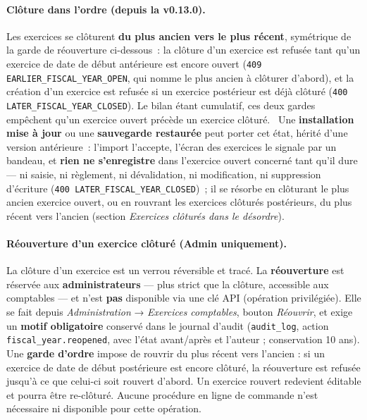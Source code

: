 \documentclass[a4paper,11pt,oneside]{article}
\begin{document}
\paragraph{Clôture dans l'ordre (depuis la v0.13.0).}
Les exercices se clôturent \textbf{du plus ancien vers le plus récent}, symétrique de la garde de réouverture ci-dessous~: la clôture d'un exercice est refusée tant qu'un exercice de date de début antérieure est encore ouvert (\texttt{409 EARLIER\_\allowbreak FISCAL\_\allowbreak YEAR\_\allowbreak OPEN}, qui nomme le plus ancien à clôturer d'abord), et la création d'un exercice est refusée si un exercice postérieur est déjà clôturé (\texttt{400 LATER\_\allowbreak FISCAL\_\allowbreak YEAR\_\allowbreak CLOSED}). Le bilan étant cumulatif, ces deux gardes empêchent qu'un exercice ouvert précède un exercice clôturé. \keshAttention\ Une \textbf{installation mise à jour} ou une \textbf{sauvegarde restaurée} peut porter cet état, hérité d'une version antérieure~: l'import l'accepte, l'écran des exercices le signale par un bandeau, et \textbf{rien ne s'enregistre} dans l'exercice ouvert concerné tant qu'il dure --- ni saisie, ni règlement, ni dévalidation, ni modification, ni suppression d'écriture (\texttt{400 LATER\_\allowbreak FISCAL\_\allowbreak YEAR\_\allowbreak CLOSED})~; il se résorbe en clôturant le plus ancien exercice ouvert, ou en rouvrant les exercices clôturés postérieurs, du plus récent vers l'ancien (section \emph{Exercices clôturés dans le désordre}).

\paragraph{Réouverture d'un exercice clôturé (Admin uniquement).}
La clôture d'un exercice est un verrou réversible et tracé. La \textbf{réouverture} est réservée aux \textbf{administrateurs} — plus strict que la clôture, accessible aux comptables — et n'est \textbf{pas} disponible via une clé API (opération privilégiée). Elle se fait depuis \emph{Administration} → \emph{Exercices comptables}, bouton \emph{Réouvrir}, et exige un \textbf{motif obligatoire} conservé dans le journal d'audit (\texttt{audit\_log}, action \texttt{fiscal\_year.reopened}, avec l'état avant/après et l'auteur ; conservation 10 ans). Une \textbf{garde d'ordre} impose de rouvrir du plus récent vers l'ancien : si un exercice de date de début postérieure est encore clôturé, la réouverture est refusée jusqu'à ce que celui-ci soit rouvert d'abord. Un exercice rouvert redevient éditable et pourra être re-clôturé. Aucune procédure en ligne de commande n'est nécessaire ni disponible pour cette opération.
\end{document}
